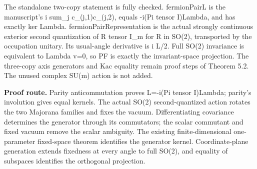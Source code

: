 The standalone two-copy statement is fully checked. fermionPairL is the manuscript's i sum\_j c\_(j,1)c\_(j,2), equals -i(Pi tensor I)Lambda, and has exactly ker Lambda. fermionPairRepresentation is the actual strongly continuous exterior second quantization of R tensor I\_m for R in SO(2), transported by the occupation unitary. Its usual-angle derivative is i L/2. Full SO(2) invariance is equivalent to Lambda v=0, so PF is exactly the invariant-space projection. The three-copy axis generators and Kac equality remain proof steps of Theorem 5.2. The unused complex SU(m) action is not added.

\textbf{Proof route.} Parity anticommutation proves L=-i(Pi tensor I)Lambda; parity's involution gives equal kernels. The actual SO(2) second-quantized action rotates the two Majorana families and fixes the vacuum. Differentiating covariance determines the generator through its commutators; the scalar commutant and fixed vacuum remove the scalar ambiguity. The existing finite-dimensional one-parameter fixed-space theorem identifies the generator kernel. Coordinate-plane generation extends fixedness at every angle to full SO(2), and equality of subspaces identifies the orthogonal projection.


